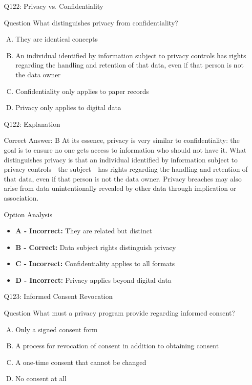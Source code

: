 \documentclass{beamer}
\begin{document}
	\begin{frame}{Q122: Privacy vs. Confidentiality}
		\begin{block}{Question}
			What distinguishes privacy from confidentiality?
		\end{block}
		\begin{enumerate}[(A)]
			\item They are identical concepts
			\item An individual identified by information subject to privacy controls has rights regarding the handling and retention of that data, even if that person is not the data owner
			\item Confidentiality only applies to paper records
			\item Privacy only applies to digital data
		\end{enumerate}
	\end{frame}
	
	\begin{frame}{Q122: Explanation}
		\begin{block}{Correct Answer: B}
			At its essence, privacy is very similar to confidentiality: the goal is to ensure no one gets access to information who should not have it. What distinguishes privacy is that an individual identified by information subject to privacy controls—the subject—has rights regarding the handling and retention of that data, even if that person is not the data owner. Privacy breaches may also arise from data unintentionally revealed by other data through implication or association.
		\end{block}
		\begin{block}{Option Analysis}
			\begin{itemize}
				\item \textbf{A - Incorrect:} They are related but distinct
				\item \textbf{B - Correct:} Data subject rights distinguish privacy
				\item \textbf{C - Incorrect:} Confidentiality applies to all formats
				\item \textbf{D - Incorrect:} Privacy applies beyond digital data
			\end{itemize}
		\end{block}
	\end{frame}
	
	\begin{frame}{Q123: Informed Consent Revocation}
		\begin{block}{Question}
			What must a privacy program provide regarding informed consent?
		\end{block}
		\begin{enumerate}[(A)]
			\item Only a signed consent form
			\item A process for revocation of consent in addition to obtaining consent
			\item A one-time consent that cannot be changed
			\item No consent at all
		\end{enumerate}
	\end{frame}
	
\end{document}
